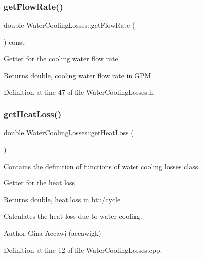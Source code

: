 \subsubsection{\texorpdfstring{get\+Flow\+Rate()}{getFlowRate()}}
{\footnotesize\ttfamily double Water\+Cooling\+Losses\+::get\+Flow\+Rate (\begin{DoxyParamCaption}{ }\end{DoxyParamCaption}) const\hspace{0.3cm}{\ttfamily [inline]}}

Getter for the cooling water flow rate \begin{DoxyReturn}{Returns}
double, cooling water flow rate in G\+PM 
\end{DoxyReturn}


Definition at line 47 of file Water\+Cooling\+Losses.\+h.

\mbox{\label{class_water_cooling_losses_a8f884cc70d7af7add5bb1be7f837384c}} 
\subsubsection{\texorpdfstring{get\+Heat\+Loss()}{getHeatLoss()}}
{\footnotesize\ttfamily double Water\+Cooling\+Losses\+::get\+Heat\+Loss (\begin{DoxyParamCaption}{ }\end{DoxyParamCaption})}



Contains the definition of functions of water cooling losses class. 

Getter for the heat loss \begin{DoxyReturn}{Returns}
double, heat loss in btu/cycle
\end{DoxyReturn}
Calculates the heat loss due to water cooling. \begin{DoxyAuthor}{Author}
Gina Accawi (accawigk) 
\end{DoxyAuthor}


Definition at line 12 of file Water\+Cooling\+Losses.\+cpp.

\mbox{\label{class_water_cooling_losses_a205b469029ec9cd4d792169bf8589f24}} 
